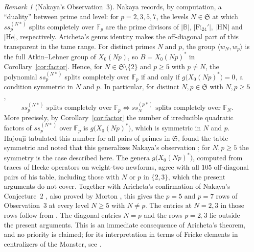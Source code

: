 \documentclass[11pt,a4paper]{article}
\theoremstyle{remark}\newtheorem{remark}[theorem]{Remark}
\numberwithin{equation}{section}
\begin{document}
	\begin{remark}[Nakaya's Observation~3]\label{rem:obs3}
		Nakaya \cite[Section~4.4, Observation~3]{Nakaya} records, by computation,
		a ``duality'' between prime and level: for $p = 2, 3, 5, 7$, the levels $N \in \mathfrak S$ at which $ss_p^{(N*)}$ splits completely over $\mathbb{F}_p$ are
		the prime divisors of $|\mathbb{B}|$, $|\mathrm{Fi}_{24}'|$, $|\mathrm{HN}|$
		and $|\mathrm{He}|$, respectively. Aricheta's genus identity makes the
		off-diagonal part of this transparent in the tame range. For distinct primes
		$N$ and $p$, the group $\langle w_N, w_p \rangle$ is the full Atkin--Lehner
		group of $X_0(Np)$, so $B = X_0(Np)^*$ in Corollary~\ref{cor:factor}. Hence, for
		$N \in \mathfrak S \setminus \{2\}$ and $p \ge 5$ with $p \ne N$, the polynomial
		$ss_p^{(N*)}$ splits completely over $\mathbb{F}_p$ if and only if
		$g\bigl(X_0(Np)^*\bigr) = 0$, a condition symmetric in $N$ and $p$. In
		particular, for distinct $N, p \in \mathfrak S$ with $N, p \ge 5$,
		\[
		ss_p^{(N*)} \text{ splits completely over } \mathbb{F}_p
		\iff
		ss_N^{(p*)} \text{ splits completely over } \mathbb{F}_N .
		\]
		More precisely, by Corollary~\ref{cor:factor} the number of irreducible
		quadratic factors of $ss_p^{(N*)}$ over $\mathbb{F}_p$ is
		$g\bigl(X_0(Np)^*\bigr)$, which is symmetric in $N$ and $p$. Hajouji
		tabulated this number for all pairs of primes in $\mathfrak S$, found the
		table symmetric and noted that this generalizes Nakaya's observation
		\cite[Section~2.5 and Table~1]{Hajouji}; for $N, p \ge 5$ the symmetry is the
		case described here. The genera $g\bigl(X_0(Np)^*\bigr)$, computed from
		traces of Hecke operators on weight-two newforms, agree with all $105$
		off-diagonal pairs of his table, including those with $N$ or $p$ in
		$\{2,3\}$, which the present arguments do not cover.
		Together with Aricheta's confirmation of Nakaya's Conjecture~2
		\cite[Remark~1.2 and Appendix~A]{Aricheta}, also proved by Morton \cite[Theorem~6]{MortonFricke}, this gives the $p = 5$ and
		$p = 7$ rows of Observation~3 at every level $N \ge 5$ with $N \ne p$. The
		entries at $N = 2, 3$ in those rows follow from \cite[Theorem~5]{Nakaya}.
		The diagonal entries $N = p$ and the rows $p = 2, 3$ lie outside the present
		arguments. This is an immediate consequence of Aricheta's theorem, and no
		priority is claimed; for its interpretation in terms of Fricke elements in
		centralizers of the Monster, see \cite[Theorem~1.3]{Aricheta}.
	\end{remark}
	
	\appendix
\end{document}
